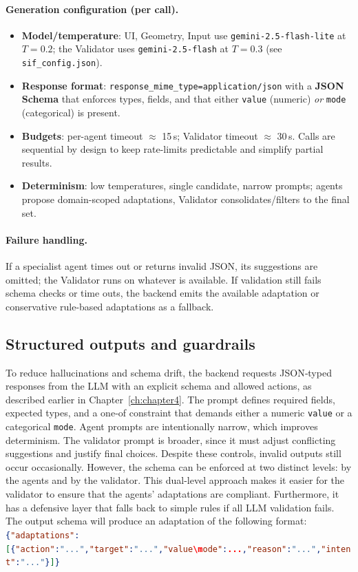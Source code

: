 \paragraph{Generation configuration (per call).}
\begin{itemize}
  \item \textbf{Model/temperature}: UI, Geometry, Input use \texttt{gemini-2.5-flash-lite} at $T{=}0.2$; the Validator uses \texttt{gemini-2.5-flash} at $T{=}0.3$ (see \texttt{sif\_config.json}).
  \item \textbf{Response format}: \texttt{response\_mime\_type=application/json} with a \textbf{JSON Schema} that enforces types, fields, and that either \texttt{value} (numeric) \emph{or} \texttt{mode} (categorical) is present.
  \item \textbf{Budgets}: per-agent timeout $\approx$ 15\,s; Validator timeout $\approx$ 30\,s. Calls are sequential by design to keep rate-limits predictable and simplify partial results.
  \item \textbf{Determinism}: low temperatures, single candidate, narrow prompts; agents propose domain-scoped adaptations, Validator consolidates/filters to the final set.
\end{itemize}

\paragraph{Failure handling.}
If a specialist agent times out or returns invalid JSON, its suggestions are omitted; the Validator runs on whatever is available. If validation still fails schema checks or time outs, the backend emits the available adaptation or conservative rule-based adaptations as a fallback.

\subsection{Structured outputs and guardrails}
To reduce hallucinations and schema drift, the backend requests JSON‑typed responses from the LLM with an explicit schema and allowed actions, as described earlier in Chapter~\ref{ch:chapter4}. The prompt defines required fields, expected types, and a one‑of constraint that demands either a numeric \texttt{value} or a categorical \texttt{mode}. Agent prompts are intentionally narrow, which improves determinism. The validator prompt is broader, since it must adjust conflicting suggestions and justify final choices. Despite these controls, invalid outputs still occur occasionally. However, the schema can be enforced at two distinct levels: by the agents and by the validator. This dual-level approach makes it easier for the validator to ensure that the agents' adaptations are compliant. Furthermore, it has a defensive layer that falls back to simple rules if all LLM validation fails.
The output schema will produce an adaptation of the following format:\\
\lstinline[language=json,basicstyle=\ttfamily\small,caption={Example adaptation Format}]|{"adaptations":[{"action":"...","target":"...","value\mode":...,"reason":"...","intent":"..."}]}|

